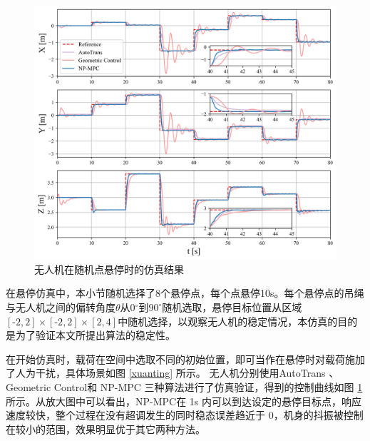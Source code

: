 \documentclass[lang=chs, degree=master, blindreview=true, winfonts=true]{yanputhesis}
\begin{document}
\begin{figure}[hbt!]
	\centering
	\includegraphics[width=33pc]{picture/kk/comparision.png} 
	\vspace{-0.2cm}
	\caption{无人机在随机点悬停时的仿真结果} 
	\label{comparision}
\end{figure}

在悬停仿真中，本小节随机选择了8个悬停点，每个点悬停10s。每个悬停点的吊绳与无人机之间的偏转角度$\theta$从0$^\circ$到$\text{90}^\circ$随机选取，悬停目标位置从区域$[\text{-2}, \text{2}] \times [\text{-2}, \text{2}] \times [\text{2}, \text{4}]$中随机选择，以观察无人机的稳定情况，本仿真的目的是为了验证本文所提出算法的稳定性。



在开始仿真时，载荷在空间中选取不同的初始位置，即可当作在悬停时对载荷施加了人为干扰，具体场景如图 \ref{xuanting} 所示。
无人机分别使用AutoTrans \cite{li2023autotrans}、Geometric Control\cite{sreenath2013geometric}和 NP-MPC 三种算法进行了仿真验证，得到的控制曲线如图 \ref{comparision} 所示。从放大图中可以看出，NP-MPC在 1s 内可以到达设定的悬停目标点，响应速度较快，整个过程在没有超调发生的同时稳态误差趋近于 0，机身的抖振被控制在较小的范围，效果明显优于其它两种方法。
\end{document}
